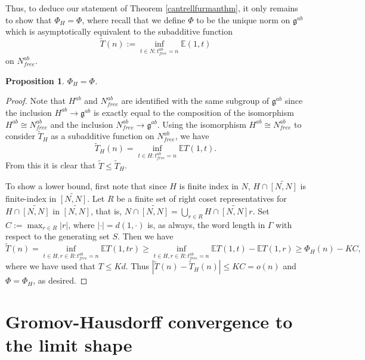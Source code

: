 \documentclass[12pt,reqno]{article}
\numberwithin{equation}{section}
\newcommand{\E}{\mathbb{E}}
\newcommand{\g}{\mathfrak{g}}
\newtheorem{prop}{Proposition}
\begin{document}
Thus, to deduce our statement of Theorem \ref{cantrellfurmanthm}, it only remains to show that $\Phi_H = \Phi$, where recall that we define
$\Phi$ to be the unique norm on $\g^{ab}$ which is asymptotically equivalent to the subadditive function
\[
   \tilde{T}(n) := \inf_{t \in N : t^{ab}_{free} = n} \E(1,t)
\]
on $N^{ab}_{free}$. 

\begin{prop}
$\Phi_H = \Phi$.
\end{prop}
\begin{proof}
Note that $H^{ab}$ and $N^{ab}_{free}$ are identified with the same subgroup of $\g^{ab}$ since the 
inclusion $H^{ab} \to \g^{ab}$ is exactly equal to the composition of the isomorphism $H^{ab} \cong N^{ab}_{free}$
and the inclusion $N^{ab}_{free} \to \g^{ab}$. Using the isomorphism $H^{ab} \cong N^{ab}_{free}$ to consider $\tilde{T}_H$
as a subadditive function on $N^{ab}_{free}$, we have
\[
   \tilde{T}_H (n) = \inf_{t \in H : t^{ab}_{free} = n} \E T(1,t).
\]
From this it is clear that $\tilde{T} \le \tilde{T}_H$.

To show a lower bound, first note that
since $H$ is finite index in $N$, $H \cap \widetilde{[N,N]}$ is finite-index in $\widetilde{[N,N]}$.
Let $R$ be a finite set of right coset representatives for $H \cap \widetilde{[N,N]}$ in $\widetilde{[N,N]}$, 
that is, $N \cap \widetilde{[N,N]} = \bigcup_{r \in R} H \cap \widetilde{[N,N]} r$.
Set $ C := \max_{r \in R} |r|$, where $|\cdot| = d(1,\cdot)$ is, as always, the word length in $\Gamma$ with respect to the generating
set $S$. Then we have
\[
   \tilde{T}(n) = \inf_{t \in H, r \in R : t^{ab}_{free} = n} \E T(1,tr) 
   \ge \inf_{t \in H, r \in R : t^{ab}_{free} = n} \E T(1,t) - \E T(1,r) \ge \Phi_H(n) - KC,
\]
where we have used that $T \le Kd$.
Thus $ |\tilde{T}(n) - \tilde{T}_H(n)| \le KC = o(n) $ and $\Phi = \Phi_H$, as desired.
\end{proof}


















\section{Gromov-Hausdorff convergence to the limit shape} \label{fillgap}
\end{document}
